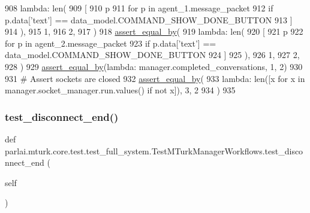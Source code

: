 \begin{DoxyCode}
908             \textcolor{keyword}{lambda}: len(
909                 [
910                     p
911                     \textcolor{keywordflow}{for} p \textcolor{keywordflow}{in} agent\_1.message\_packet
912                     \textcolor{keywordflow}{if} p.data[\textcolor{stringliteral}{'text'}] == data\_model.COMMAND\_SHOW\_DONE\_BUTTON
913                 ]
914             ),
915             1,
916             2,
917         )
918         \hyperlink{namespaceparlai_1_1mturk_1_1core_1_1test_1_1test__full__system_a0b463246d35658a2e422010f13dcf819}{assert\_equal\_by}(
919             \textcolor{keyword}{lambda}: len(
920                 [
921                     p
922                     \textcolor{keywordflow}{for} p \textcolor{keywordflow}{in} agent\_2.message\_packet
923                     \textcolor{keywordflow}{if} p.data[\textcolor{stringliteral}{'text'}] == data\_model.COMMAND\_SHOW\_DONE\_BUTTON
924                 ]
925             ),
926             1,
927             2,
928         )
929         \hyperlink{namespaceparlai_1_1mturk_1_1core_1_1test_1_1test__full__system_a0b463246d35658a2e422010f13dcf819}{assert\_equal\_by}(\textcolor{keyword}{lambda}: manager.completed\_conversations, 1, 2)
930 
931         \textcolor{comment}{# Assert sockets are closed}
932         \hyperlink{namespaceparlai_1_1mturk_1_1core_1_1test_1_1test__full__system_a0b463246d35658a2e422010f13dcf819}{assert\_equal\_by}(
933             \textcolor{keyword}{lambda}: len([x \textcolor{keywordflow}{for} x \textcolor{keywordflow}{in} manager.socket\_manager.run.values() \textcolor{keywordflow}{if} \textcolor{keywordflow}{not} x]), 3, 2
934         )
935 
\end{DoxyCode}
\mbox{\label{classparlai_1_1mturk_1_1core_1_1test_1_1test__full__system_1_1TestMTurkManagerWorkflows_a8af4ec1e17ef7dc37903d839ff4882f0}} 
\subsubsection{\texorpdfstring{test\+\_\+disconnect\+\_\+end()}{test\_disconnect\_end()}}
{\footnotesize\ttfamily def parlai.\+mturk.\+core.\+test.\+test\+\_\+full\+\_\+system.\+Test\+M\+Turk\+Manager\+Workflows.\+test\+\_\+disconnect\+\_\+end (\begin{DoxyParamCaption}\item[{}]{self }\end{DoxyParamCaption})}



